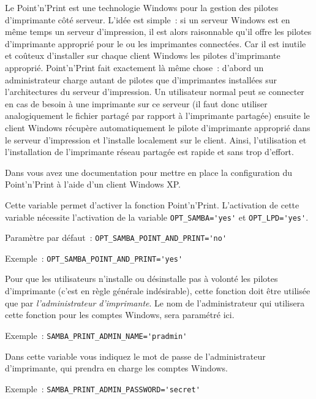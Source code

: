 Le Point'n'Print est une technologie Windows pour la gestion des pilotes d'imprimante
côté serveur. L'idée est simple~: si un serveur Windows est en même temps un serveur
d'impression, il est alors raisonnable qu'il offre les pilotes d'imprimante approprié
pour le ou les imprimantes connectées. Car il est inutile et coûteux d'installer sur
chaque client Windows les pilotes d'imprimante approprié. Point'n'Print fait exactement
là même chose~: d'abord un administrateur charge autant de pilotes que d'imprimantes installées
sur l'architectures du serveur d'impression. Un utilisateur normal peut se connecter
en cas de besoin à une imprimante sur ce serveur (il faut donc utiliser analogiquement le
fichier partagé par rapport à l'imprimante partagée) ensuite le client Windows récupère
automatiquement le pilote d'imprimante approprié dans le serveur d'impression et l'installe
localement sur le client. Ainsi, l'utilisation et l'installation de l'imprimante réseau
partagée est rapide et sans trop d'effort.

Dans  vous avez une documentation pour
mettre en place la configuration du Point'n'Print à l'aide d'un client Windows XP.

\begin{description}



Cette variable permet d'activer la fonction Point'n'Print. L'activation de cette
variable nécessite l'activation de la variable \verb+OPT_SAMBA='yes'+ et
\verb+OPT_LPD='yes'+.

Paramètre par défaut~: \verb+OPT_SAMBA_POINT_AND_PRINT='no'+

Exemple~: \verb+OPT_SAMBA_POINT_AND_PRINT='yes'+



Pour que les utilisateurs n'installe ou désinstalle pas à volonté les pilotes
d'imprimante (c'est en règle générale indésirable), cette fonction doit être utilisée
que par \emph{l'administrateur d'imprimante}. Le nom de l'administrateur qui utilisera
cette fonction pour les comptes Windows, sera paramétré ici.

Exemple~: \verb+SAMBA_PRINT_ADMIN_NAME='pradmin'+



Dans cette variable vous indiquez le mot de passe de l'administrateur d'imprimante, qui
prendra en charge les comptes Windows.

Exemple~: \verb+SAMBA_PRINT_ADMIN_PASSWORD='secret'+

\end{description}


